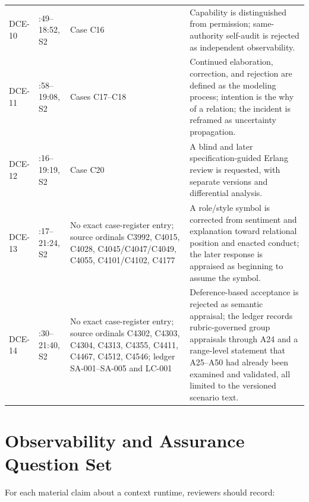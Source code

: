 \documentclass[10pt,a4paper]{article}
\begin{document}
\begin{longtable}{>{\raggedright\arraybackslash}p{}>{\raggedright\arraybackslash}p{}>{\raggedright\arraybackslash}p{}>{\raggedright\arraybackslash}p{}}
DCE-10 & 18:49--18:52, S2 & Case C16 & Capability is distinguished from permission; same-authority self-audit is rejected as independent observability. \\
DCE-11 & 18:58--19:08, S2 & Cases C17--C18 & Continued elaboration, correction, and rejection are defined as the modeling process; intention is the why of a relation; the incident is reframed as uncertainty propagation. \\
DCE-12 & 19:16--19:19, S2 & Case C20 & A blind and later specification-guided Erlang review is requested, with separate versions and differential analysis. \\
DCE-13 & 21:17--21:24, S2 & No exact case-register entry; source ordinals C3992, C4015, C4028, C4045/C4047/C4049, C4055, C4101/C4102, C4177 & A role/style symbol is corrected from sentiment and explanation toward relational position and enacted conduct; the later response is appraised as beginning to assume the symbol. \\
DCE-14 & 21:30--21:40, S2 & No exact case-register entry; source ordinals C4302, C4303, C4304, C4313, C4355, C4411, C4467, C4512, C4546; ledger SA-001--SA-005 and LC-001 & Deference-based acceptance is rejected as semantic appraisal; the ledger records rubric-governed group appraisals through A24 and a range-level statement that A25--A50 had already been examined and validated, all limited to the versioned scenario text. \\
\hline
\end{longtable}

\section{Observability and Assurance Question Set}

For each material claim about a context runtime, reviewers should record:
\end{document}
